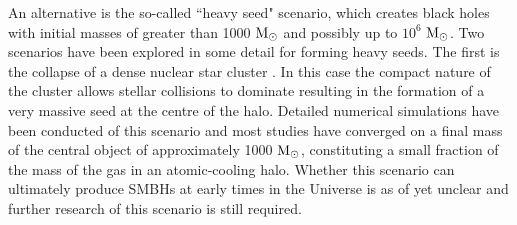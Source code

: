 \documentclass[graphics, twocolumn, usenatbib]{mn2e}
\newcommand{\msolar} {$\rm{M_{\odot}}~$}
\newcommand{\msolarc} {$\rm{M_{\odot}}$}
\begin{document}
\indent An alternative is the so-called ``heavy seed" scenario, which creates black holes with initial masses of
greater than 1000 \msolar and possibly up to $10^{6}$ \msolarc. Two scenarios have been
explored in some detail for forming heavy seeds. The first is the collapse of a dense
nuclear star cluster \citep{PortegiesZwart_2004, Freitag_2008, Omukai_2008,Devecchi_2008, Merritt_2008,
  Davies_2011, Lupi_2014}. In this case the compact nature of the cluster allows
stellar collisions to dominate resulting in the formation of a very massive seed at the
centre of the halo. Detailed numerical simulations have been conducted \cite[e.g.][]{Katz_2015,
  Reinoso_2018} of this scenario and
most studies have converged on a final mass of the central object of approximately 1000 \msolarc, constituting a small fraction of the mass of the gas in an atomic-cooling halo.
Whether this scenario can ultimately produce SMBHs at early times in the Universe is as of yet
unclear and further research of this scenario is still required. \\
\end{document}
